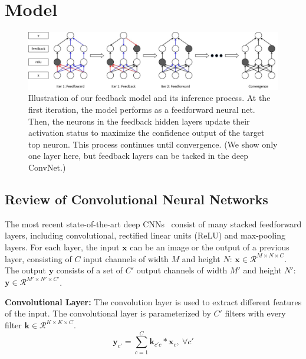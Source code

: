 \section{Model}
\label{sec:model}

\setlength{\tabcolsep}{2pt}
\begin{figure}
\begin{center}
\includegraphics[width=0.95\linewidth]{figs/model/model}
\caption{Illustration of our feedback model and its inference process. At the first iteration, the model performs as a feedforward neural net. Then, the neurons in the feedback hidden layers update their activation status to maximize the confidence output of the target top neuron. This process continues until convergence. (We show only one layer here, but feedback layers can be tacked in the deep ConvNet.)}
\label{fig:model}
\end{center}
\end{figure}

\subsection{Review of Convolutional Neural Networks}
The most recent state-of-the-art deep CNNs~\cite{Simonyan2014Very} consist of many stacked feedforward layers, including convolutional, rectified linear units (ReLU) and max-pooling layers. For each layer, the input $\mathbf{x}$ can be an image or the output of a previous layer, consisting of $C$ input channels of width $M$ and height $N$: $\mathbf{x} \in \mathcal{R}^{M \times N \times C}$. The output $\mathbf{y}$ consists of a set of $C'$ output channels of width $M'$ and height $N'$: $\mathbf{y} \in \mathcal{R}^{M' \times N' \times C'}$.

\textbf{Convolutional Layer:}
The convolution layer is used to extract different features of the input. The convolutional layer is parameterized by $C'$ filters with every filter $\mathbf{k} \in \mathcal{R}^{K \times K \times C}$.
\begin{equation}
\mathbf{y}_{c'} = \sum_{c=1}^C \mathbf{k}_{c'c} * \mathbf{x}_c,\ \forall c'
\end{equation}

